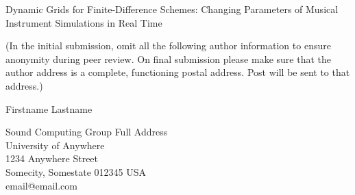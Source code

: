 \documentclass[letterpaper, 12pt, dvipsnames]{article}
\begin{document}
{\cmjTitle Dynamic Grids for Finite-Difference Schemes: Changing Parameters of Musical Instrument Simulations in Real Time}
\vspace*{24pt}

(In the initial submission, omit all the following author information to ensure anonymity during peer review.
On final submission please make sure that the author address is a complete, functioning postal address.
Post will be sent to that address.)

{\cmjAuthor Firstname Lastname}	%
 
\begin{cmjAuthorAddress}
	Sound Computing Group Full Address\\
	University of Anywhere\\
	1234 Anywhere Street\\
	Somecity, Somestate 012345 USA\\		%
	email@email.com
\end{cmjAuthorAddress}


\begin{abstract}
	
\end{abstract}


\parskip 18pt

\parskip 18pt

\parskip 18pt

\parskip 18pt

\parskip 18pt

\parskip 18pt

\parskip 18pt





\end{document}
